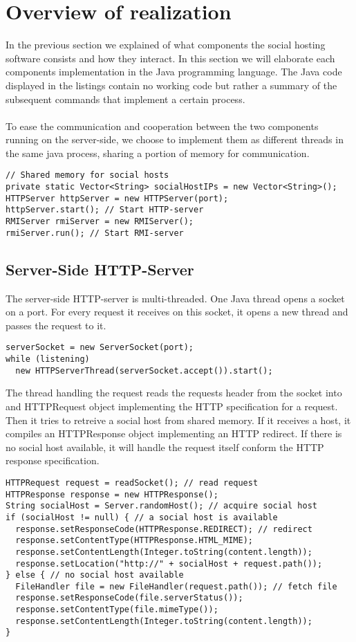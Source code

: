 \documentclass[a4paper, 10pt]{article}
\begin{document}
\section{Overview of realization}
In the previous section we explained of what components the social hosting software consists and how they interact. In this section we will elaborate each components implementation in the Java programming language. The Java code displayed in the listings contain no working code but rather a summary of the subsequent commands that implement a certain process.
\\
\\
To ease the communication and cooperation between the two components running on the server-side, we choose to implement them as different threads in the same java process, sharing a portion of memory for communication.
\begin{lstlisting}
// Shared memory for social hosts
private static Vector<String> socialHostIPs = new Vector<String>(); 
HTTPServer httpServer = new HTTPServer(port); 
httpServer.start(); // Start HTTP-server
RMIServer rmiServer = new RMIServer();
rmiServer.run(); // Start RMI-server
\end{lstlisting}

\subsection{Server-Side HTTP-Server}
The server-side HTTP-server is multi-threaded. One Java thread opens a socket on a port. For every request it receives on this socket, it opens a new thread and passes the request to it. 
\begin{lstlisting}
serverSocket = new ServerSocket(port);
while (listening)
  new HTTPServerThread(serverSocket.accept()).start();
\end{lstlisting}
The thread handling the request reads the requests header from the socket into and HTTPRequest object implementing the HTTP specification for a request. Then it tries to retreive a social host from shared memory. If it receives a host, it compiles an HTTPResponse object implementing an HTTP redirect. If there is no social host available, it will handle the request itself conform the HTTP response specification.
\begin{lstlisting}
HTTPRequest request = readSocket(); // read request
HTTPResponse response = new HTTPResponse();
String socialHost = Server.randomHost(); // acquire social host
if (socialHost != null) { // a social host is available
  response.setResponseCode(HTTPResponse.REDIRECT); // redirect
  response.setContentType(HTTPResponse.HTML_MIME);
  response.setContentLength(Integer.toString(content.length));
  response.setLocation("http://" + socialHost + request.path());
} else { // no social host available
  FileHandler file = new FileHandler(request.path()); // fetch file
  response.setResponseCode(file.serverStatus());
  response.setContentType(file.mimeType());
  response.setContentLength(Integer.toString(content.length));
}
\end{lstlisting}
\end{document}
